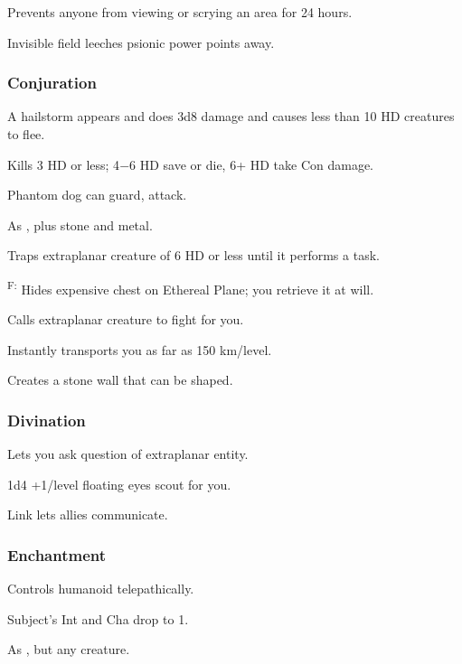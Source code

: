 	 Prevents anyone from viewing or scrying an area for 24 hours.

	 Invisible field leeches psionic power points away.

\subsubsection{Conjuration}
	 A hailstorm appears and does 3d8 damage and causes less than 10 HD creatures to flee. %

	 Kills 3 HD or less; 4$-6$ HD save or die, 6+ HD take Con damage.

	 Phantom dog can guard, attack.

	 As , plus stone and metal.

	 Traps extraplanar creature of 6 HD or less until it performs a task.

	\textsuperscript{F:} Hides expensive chest on Ethereal Plane; you retrieve it at will.

	 Calls extraplanar creature to fight for you.

	 Instantly transports you as far as 150 km/level.

	 Creates a stone wall that can be shaped.

\subsubsection{Divination}
	 Lets you ask question of extraplanar entity.

	 1d4 +1/level floating eyes scout for you.

	 Link lets allies communicate.

\subsubsection{Enchantment}
	 Controls humanoid telepathically.

	 Subject's Int and Cha drop to 1.

	 As , but any creature.

